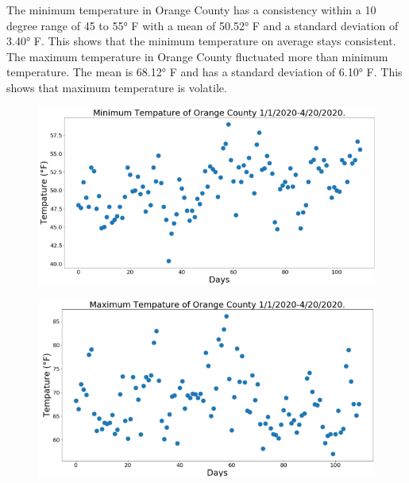 \documentclass[10pt,journal,compsoc]{IEEEtran}
\begin{document}
{{{	The minimum temperature in Orange County has a consistency within a 10 degree range of 45 to 55° F with a mean of 50.52° F and a standard deviation of 3.40° F. This shows that the minimum temperature on average stays consistent. The maximum temperature in Orange County fluctuated more than minimum temperature. The mean is 68.12° F and  has a standard deviation of 6.10° F. This shows that maximum temperature is volatile.

 \begin{figure}[!htbp] %
	\includegraphics[scale=0.45]{min-orange.png}\\ 
	\centering
	\label{LP-COVID-Minimum Temperature}
\end{figure}

\begin{figure}[!htbp] %
	\includegraphics[scale=0.45]{max-orange.png}\\ 
	\centering
	\label{LP-COVID-Maximum Temperature}
\end{figure}

}}}
\end{document}
